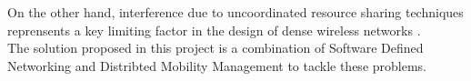 On the other hand, interference due to uncoordinated resource sharing techniques reprensents a key limiting factor in the design of dense wireless networks \cite{sdn_dense}.\\

The solution proposed in this project is a combination of Software Defined Networking and Distribted Mobility Management to tackle these problems.









